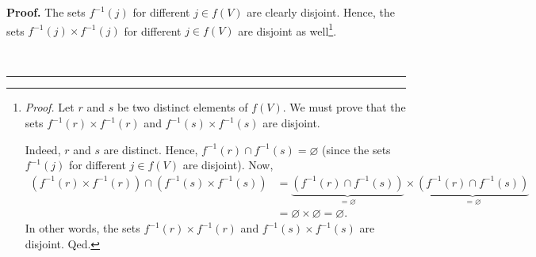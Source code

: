 \documentclass[numbers=enddot,12pt,final,onecolumn,notitlepage]{scrartcl}%
\numberwithin{exer}{section}
\theoremstyle{definition}
\newenvironment{proof}[1][Proof]{\noindent\textbf{#1.} }{\ \rule{0.5em}{0.5em}}
\newenvironment{verlong}{}{}
\begin{document}
\begin{verlong}


\begin{proof}
The sets $f^{-1}\left(  j\right)  $ for different $j\in f\left(  V\right)  $
are clearly disjoint. Hence, the sets $f^{-1}\left(  j\right)  \times
f^{-1}\left(  j\right)  $ for different $j\in f\left(  V\right)  $ are
disjoint as well\footnote{\textit{Proof.} Let $r$ and $s$ be two distinct
elements of $f\left(  V\right)  $. We must prove that the sets $f^{-1}\left(
r\right)  \times f^{-1}\left(  r\right)  $ and $f^{-1}\left(  s\right)  \times
f^{-1}\left(  s\right)  $ are disjoint.
\par
Indeed, $r$ and $s$ are distinct. Hence, $f^{-1}\left(  r\right)  \cap
f^{-1}\left(  s\right)  =\varnothing$ (since the sets $f^{-1}\left(  j\right)
$ for different $j\in f\left(  V\right)  $ are disjoint). Now,%
\begin{align*}
\left(  f^{-1}\left(  r\right)  \times f^{-1}\left(  r\right)  \right)
\cap\left(  f^{-1}\left(  s\right)  \times f^{-1}\left(  s\right)  \right)
&  =\underbrace{\left(  f^{-1}\left(  r\right)  \cap f^{-1}\left(  s\right)
\right)  }_{=\varnothing}\times\underbrace{\left(  f^{-1}\left(  r\right)
\cap f^{-1}\left(  s\right)  \right)  }_{=\varnothing}\\
&  =\varnothing\times\varnothing=\varnothing.
\end{align*}
In other words, the sets $f^{-1}\left(  r\right)  \times f^{-1}\left(
r\right)  $ and $f^{-1}\left(  s\right)  \times f^{-1}\left(  s\right)  $ are
disjoint. Qed.}.


\end{proof}
\end{verlong}
\end{document}
